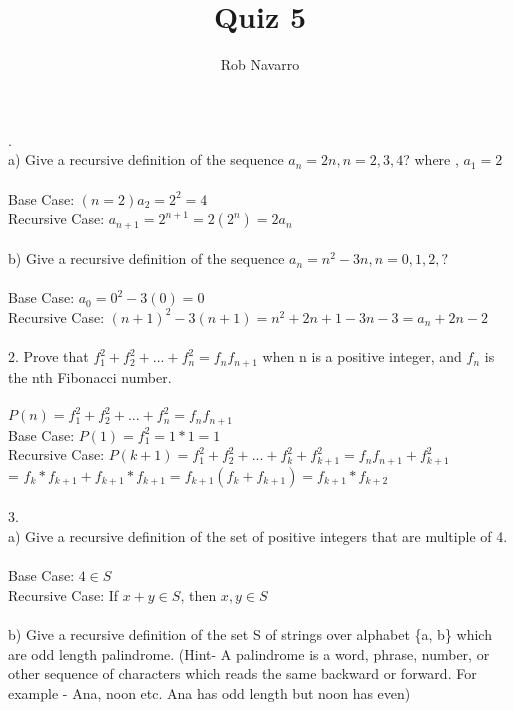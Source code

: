 \documentclass[11pt, oneside]{article}   	%
\title{Quiz 5}
\author{Rob Navarro}
\begin{document}
\maketitle

. \\
a) Give a recursive definition of the sequence $a_n = 2n ,n = 2, 3, 4$? where , $a_1 = 2$\\\\
Base Case: $(n = 2) a_2 = 2^2 = 4$\\
Recursive Case: $a_{n+1} = 2^{n+1} = 2(2^n) = 2a_n $  \\\\
b) Give a recursive definition of the sequence $a_n=n^2 - 3n , n = 0,1,2,?$\\\\
Base Case: $a_0 = 0^2 - 3(0) = 0$\\
Recursive Case: $ (n+1)^2 - 3(n+1) = n^2 + 2n + 1 - 3n - 3 = a_n + 2n - 2$\\\\
2. Prove that $f_1^2 + f_2^2 + . . . + f_n^2  = f_nf_{n+1} $ when n is a positive integer, and $f_n$  is the nth Fibonacci number.\\\\
$P(n) = f_1^2 + f_2^2 + . . . + f_n^2  = f_nf_{n+1} $\\
Base Case: $P(1) = f_1^2 = 1*1 = 1$\\
Recursive Case: $P(k + 1) = f_1^2 + f_2^2 + . . . + f_k^2 + f_{k+1}^2  = f_nf_{n+1}  + f_{k+1}^2 $\\
= $f_k * f_{k+1} + f_{k+1} * f_{k+1} = f_{k+1}(f_k + f_{k+1}) = f_{k+1} * f_{k+2}$\\\\
3. \\
a) Give a recursive definition of the set of positive integers that are multiple of 4. \\\\
Base Case: $4\in S$\\
Recursive Case: If $x + y\in S$, then $x,y\in S$\\\\
b) Give a recursive definition of the set S of strings over alphabet \{a, b\} which are odd length palindrome. (Hint- A palindrome is a word, phrase, number, or other sequence of characters which reads the same backward or forward. For example - Ana, noon etc. Ana has odd length but noon has even)\\\\\\
\end{document}
